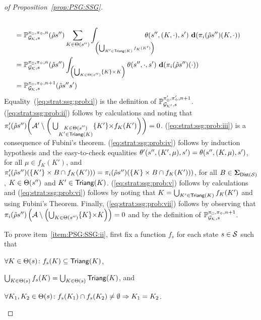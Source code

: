 \begin{proof}[of Proposition~\ref{prop:PSG:SSG}]
\begin{align}
    \label{eq:strat:ssg:prob:iv}\\
    & =
    \Prob^{\strat_{\maxplay},\strat_{\minplay},n}_{\StochGK,s}(\hat{\rho}s'')\sum_{K\in\psgtrans(s'')}\int_{_{\left(\bigcup_{K'\in\Triang(K)}f_K(K')\right)}}\hspace{-1.7em}\sgtrans(s'',(K,\cdot),s')\ \diff(\strat_{i}(\hat{\rho}s'')(K,\cdot))
    \label{eq:strat:ssg:prob:v}\\
    & =
    \Prob^{\strat_{\maxplay},\strat_{\minplay},n}_{\StochGK,s}(\hat{\rho}s'')\int_{\left(\bigcup_{K\in\psgtrans(s'')} \{K\}{\times}K\right)}\sgtrans(s'',\cdot,s')\ \diff(\strat_{i}(\hat{\rho}s'')(\cdot))
    \label{eq:strat:ssg:prob:vi}\\
    & =
    \Prob^{\strat_{\maxplay},\strat_{\minplay},n+1}_{\StochGK,s}(\hat{\rho}s''s')
    \label{eq:strat:ssg:prob:vii}
  \end{align}
  Equality~(\ref{eq:strat:ssg:prob:i}) is the definition of
  $\mathbb{P}^{\pi'_{{\Box}},\pi'_{{\Diamond}},n+1}_{{\mathcal{G}_{\mathcal{K}'}},s}$.
  (\ref{eq:strat:ssg:prob:ii}) follows by calculations and noting that
  $\pi'_{i}(\hat{\rho}s'')\bigg(\mathcal{A}'\setminus\bigg(\bigcup_{\substack{K\in\Theta(s'')\\K'\in\mathsf{Triang}(K)}}\{K'\}{\times}f_{K}(K')\bigg)\bigg)=0$.
  (\ref{eq:strat:ssg:prob:iii}) is a consequence of Fubini's theorem.
  (\ref{eq:strat:ssg:prob:iv}) follows by induction hypothesis and the
  easy-to-check equalities
  $\theta'(s'',(K',\mu),s')=\theta(s'',(K,\mu),s')$, for all
  $\mu\in f_K(K')$, and
  $\pi'_{i}(\hat{\rho}s'')(\{K'\}\times B\cap f_K(K'))) = \pi_{i}(\hat{\rho}s'')(\{K\}\times B\cap f_K(K')))$,
  for all $B\in\bm{\Sigma}_{\mathsf{Dist}(\mathcal{S})}$, $K\in\Theta(s'')$ and
  $K'\in\mathsf{Triang}(K)$.
  (\ref{eq:strat:ssg:prob:v}) follows by calculations and
  (\ref{eq:strat:ssg:prob:vi}) follows by noting that
  $K=\bigcup_{K'\in\mathsf{Triang}(K)}f_K(K')$ and using Fubini's Theorem.
  Finally, (\ref{eq:strat:ssg:prob:vii}) follows by observing that
  $\pi_{i}(\hat{\rho}s'')\left(\mathcal{A}\setminus\left(\bigcup_{K\in\Theta(s'')}\{K\}{\times}K\right)\right)=0$
  and by the definition of
  $\mathbb{P}^{\pi_{{\Box}},\pi_{{\Diamond}},n+1}_{{\mathcal{G}_{\mathcal{K}}},s}$.

  \medskip
  
  To prove item~\ref{item:PSG:SSG:ii}, first fix a function $f_s$ for
  each state $s\in\mathcal{S}$ such that
  \begin{enumerate*}[(i)]
  \item%
    $\forall {K\in\Theta(s)}\colon {f_s(K)\subseteq\mathsf{Triang}(K)}$,
  \item%
    $\bigcup_{K\in\Theta(s)}f_s(K)=\bigcup_{K\in\Theta(s)}\mathsf{Triang}(K)$, and
  \item%
    $\forall {K_1,K_2\in\Theta(s)}\colon {{f_s(K_1)\cap f_s(K_2)\neq\emptyset} \Rightarrow{K_1=K_2}}$.
  \end{enumerate*}


\end{proof}
